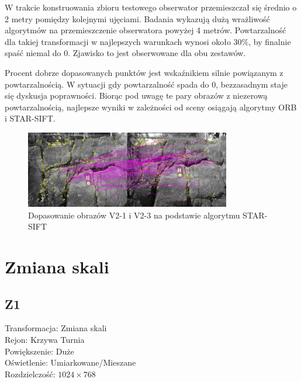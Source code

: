 W trakcie konstruowania zbioru testowego obserwator przemieszczał się średnio o 2 metry pomiędzy kolejnymi ujęciami. Badania wykazują dużą wrażliwość algorytmów na przemieszczenie obserwatora powyżej 4 metrów. Powtarzalność dla takiej transformacji w najlepszych warunkach wynosi około 30\%, by finalnie spaść niemal do 0. Zjawisko to jest obserwowane dla obu zestawów.

Procent dobrze dopasowanych punktów jest wskaźnikiem silnie powiązanym z powtarzalnością. W sytuacji gdy powtarzalność spada do 0, bezzasadnym staje się dyskusja poprawności. Biorąc pod uwagę te pary obrazów z niezerową powtarzalnością, najlepsze wyniki w zależności od sceny osiągają algorytmy ORB i STAR-SIFT.

\begin{figure}
\centering
\includegraphics[width=0.8\textwidth]{pict/badania/v2_star_sift_1_3.png}
\caption{Dopasowanie obrazów V2-1 i V2-3 na podstawie algorytmu STAR-SIFT}
\end{figure}

\newpage
\section{Zmiana skali}
\subsection{Z1}
Transformacja: Zmiana skali\\
Rejon: Krzywa Turnia\\
Powiększenie: Duże\\
Oświetlenie: Umiarkowane/Mieszane\\
Rozdzielczość: $1024 \times 768$


